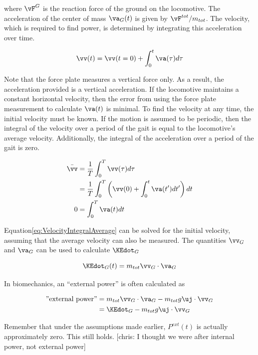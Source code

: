 where $\vF^{G}$ is the reaction force of the ground on the locomotive. The acceleration of the center of mass $\va_{G}(t)$ is given by $\vF^{tot}/m_{tot}$. The velocity, which is required to find power, is determined by integrating this acceleration over time.

\begin{equation}
\vv(t) = \vv(t=0) + \int_{0}^{t} \va(\tau) d\tau
\label{eq:VelocityIntegral}
\end{equation}

Note that the force plate measures a vertical force only. As a result, the acceleration provided is a vertical acceleration. If the locomotive maintains a constant horizontal velocity, then the error from using the force plate measurement to calculate $\va(t)$ is minimal. To find the velocity at any time, the initial velocity must be known. If the motion is assumed to be periodic, then the integral of the velocity over a period of the gait is equal to the locomotive's average velocity. Additionally, the integral of the acceleration over a period of the gait is zero.

\begin{align}
\bar{\vv} &= \frac{1}{T}\int_{0}^{T} \vv(\tau)d\tau \notag \\
&= \frac{1}{T} \int_0^{T} \left( \vv(0) + \int_0^t \va(t') dt' \right) dt \\
0 &= \int_{0}^{T} \va(t)dt
\label{eq:VelocityIntegralAverage}
\end{align}

Equation\ref{eq:VelocityIntegralAverage} can be solved for the initial velocity, assuming that the average velocity can also be measured. The quantities $\vv_{G}$ and $\va_{G}$ can be used to calculate $\KEdot_{G}$

\begin{equation}
\KEdot_{G}(t) = m_{tot} \vv_{G} \cdot \va_{G}
\end{equation}

In biomechanics, an ``external power'' is often calculated as

\begin{align}
\mbox{''external power''} &= m_{tot} \vv_{G} \cdot \va_{G} - m_{tot} g \uj \cdot \vv_{G} \notag \\
&= \KEdot_{G} - m_{tot} g \uj \cdot \vv_{G}
\end{align}

Remember that under the assumptions made earlier, $P^{ext}(t)$ is actually approximately zero. This still holds. [chris: I thought we were after internal power, not external power]

